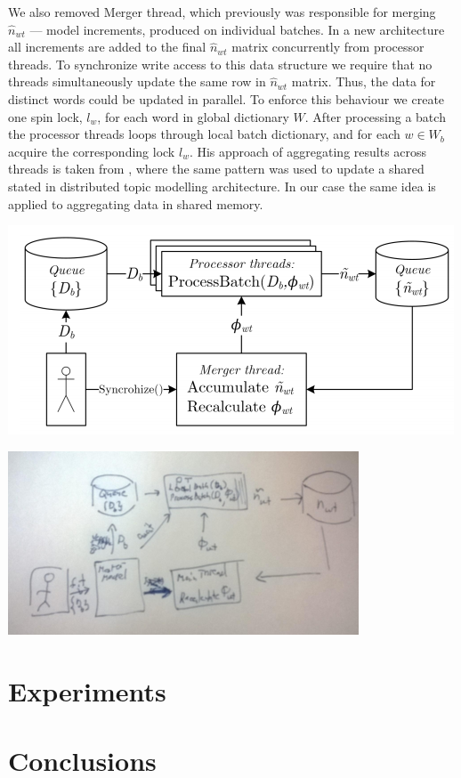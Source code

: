 \documentclass[russian,english]{llncs}
\begin{document}
We also removed Merger thread, which previously was responsible
for merging $\hat n_{wt}$ --- model increments, produced on individual batches.
In a new architecture all increments are added to the final $\hat n_{wt}$ matrix
concurrently from processor threads.
To synchronize write access to this data structure we require that
no threads simultaneously update the same row in $\hat n_{wt}$ matrix.
Thus, the data for distinct words could be updated in parallel.
To enforce this behaviour we create one spin lock, $l_w$, for each word in global dictionary $W$.
After processing a batch the processor threads loops through local batch dictionary,
and for each $w \in W_b$ acquire the corresponding lock $l_w$.
His approach of aggregating results across threads is taken from \cite{smola10architecture},
where the same pattern was used to update a shared stated in distributed topic modelling architecture.
In our case the same idea is applied to aggregating data in shared memory.

\includegraphics[natwidth=501bp,natheight=235bp,width=270bp]{old_arch.png}

\includegraphics[natwidth=394bp,natheight=206bp,width=270bp]{new_arch.png}

\section{Experiments}
\label{sec:Experiments}

\section{Conclusions}
\label{sec:Conclusions}
\end{document}
